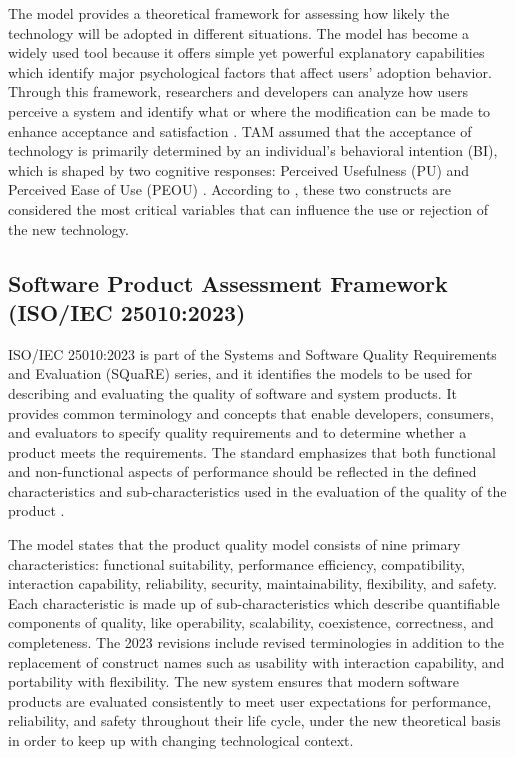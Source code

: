 The model provides a theoretical framework for assessing how likely the technology will be adopted in different situations. The model has become a widely used tool because it offers simple yet powerful explanatory capabilities which identify major psychological factors that affect users’ adoption behavior. Through this framework, researchers and developers can analyze how users perceive a system and identify what or where the modification can be made to enhance acceptance and satisfaction \parencite{Marikyan2025TAM}. TAM assumed that the acceptance of technology is primarily determined by an individual’s behavioral intention (BI), which is shaped by two cognitive responses: Perceived Usefulness (PU) and Perceived Ease of Use (PEOU) \parencite{Marikyan2025TAM}. According to \textcite{Aburbeian2022}, these two constructs are considered the most critical variables that can influence the use or rejection of the new technology.


\subsection{Software Product Assessment Framework (ISO/IEC 25010:2023)}

ISO/IEC 25010:2023 is part of the Systems and Software Quality Requirements and Evaluation (SQuaRE) series, and it identifies the models to be used for describing and evaluating the quality of software and system products. It provides common terminology and concepts that enable developers, consumers, and evaluators to specify quality requirements and to determine whether a product meets the requirements. The standard emphasizes that both functional and non-functional aspects of performance should be reflected in the defined characteristics and sub-characteristics used in the evaluation of the quality of the product \parencite{ISO25010Web,ISOIEC25010_2023}.

The model states that the product quality model consists of nine primary characteristics: functional suitability, performance efficiency, compatibility, interaction capability, reliability, security, maintainability, flexibility, and safety. Each characteristic is made up of sub-characteristics which describe quantifiable components of quality, like operability, scalability, coexistence, correctness, and completeness. The 2023 revisions include revised terminologies in addition to the replacement of construct names such as usability with interaction capability, and portability with flexibility. The new system ensures that modern software products are evaluated consistently to meet user expectations for performance, reliability, and safety throughout their life cycle, under the new theoretical basis in order to keep up with changing technological context.


